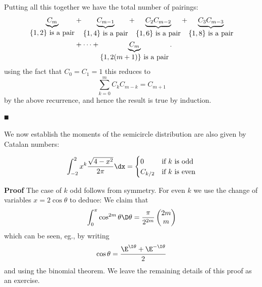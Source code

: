 Putting all this together we have the total number of pairings:
\begin{align*}
\underbrace{C_m}_{\hbox{$\{1,2\}$ is a pair}} &+ 
\underbrace{C_{m-1}}_{\hbox{$\{1,4\}$ is a pair}} + 
\underbrace{C_2 C_{m-2}}_{\hbox{$\{1,6\}$ is a pair}} +
\underbrace{C_3 C_{m-3}}_{\hbox{$\{1,8\}$ is a pair}} \\
& + \ensuremath{\cdots} + 
\underbrace{C_m}_{\hbox{$\{1,2(m+1)\}$ is a pair}}.
\end{align*}
using the fact that $C_0 = C_1 = 1$ this reduces to
\[
\ensuremath{\sum}_{k=0}^m  C_k C_{m-k} = C_{m+1}
\]
by the above recurrence, and hence the result is true by induction.

\ensuremath{\QED}

We now establish the moments of the semicircle distribution are also given by Catalan numbers: 

\begin{lemma}
\[
\ensuremath{\int}_{-2}^2 x^k {\sqrt{4-x^2} \over 2\ensuremath{\pi}} \dx = \begin{cases}
0 & \hbox{\textrm{if  $k$ is odd}} \\
C_{k/2} & \hbox{\textrm{if $k$ is even}}
\end{cases}
\]
\end{lemma}
\textbf{Proof} The case of $k$ odd follows from symmetry. For even $k$ we use the change of variables $x = 2 \cos \ensuremath{\theta}$ to deduce:
We claim that
\[
\ensuremath{\int}_0^\ensuremath{\pi} \cos^{2m} \ensuremath{\theta} \D\ensuremath{\theta} = {\ensuremath{\pi} \over 2^{2m}} \begin{pmatrix}
2m \\ m
\end{pmatrix}
\]
which can be seen, eg., by writing
\[
\cos \ensuremath{\theta} = {\E^{\I \ensuremath{\theta}} + \E^{-\I \ensuremath{\theta}} \over 2}
\]
and using the binomial theorem.  We leave the remaining details of this proof as an exercise.

